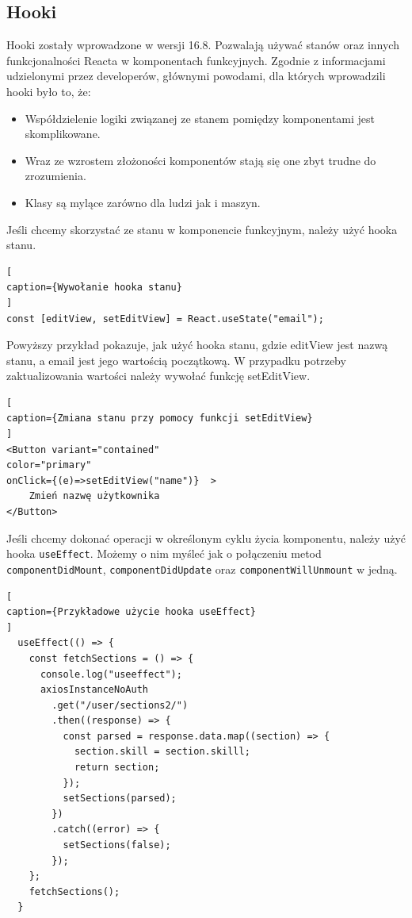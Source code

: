 \documentclass[oneside,polski,logo,indent]{amuthesis}
\begin{document}
\subsection{Hooki}
Hooki zostały wprowadzone w wersji 16.8. Pozwalają używać stanów oraz innych funkcjonalności Reacta w komponentach funkcyjnych.
\newline
Zgodnie z informacjami udzielonymi przez developerów, głównymi powodami, dla których wprowadzili hooki było to, że:
\begin{itemize}
\item Współdzielenie logiki związanej ze stanem pomiędzy komponentami jest skomplikowane.
\item Wraz ze wzrostem złożoności komponentów stają się one zbyt trudne do zrozumienia.
\item Klasy są mylące zarówno dla ludzi jak i maszyn.
\end{itemize}
Jeśli chcemy skorzystać ze stanu w komponencie funkcyjnym, należy użyć hooka stanu.
\begin{lstlisting}[
caption={Wywołanie hooka stanu}
]
const [editView, setEditView] = React.useState("email");
\end{lstlisting}
Powyższy przykład pokazuje, jak użyć hooka stanu, gdzie editView jest nazwą stanu, a email jest jego wartością początkową. W przypadku potrzeby zaktualizowania wartości należy 
wywołać funkcję setEditView.
\begin{lstlisting}[
caption={Zmiana stanu przy pomocy funkcji setEditView}
]
<Button variant="contained" 
color="primary" 
onClick={(e)=>setEditView("name")}  >
	Zmień nazwę użytkownika
</Button>
\end{lstlisting}
Jeśli chcemy dokonać operacji w określonym cyklu życia komponentu, należy użyć hooka \texttt{useEffect}. Możemy o nim myśleć jak o połączeniu metod \texttt{componentDidMount}, \texttt{componentDidUpdate} oraz \texttt{componentWillUnmount} w jedną.
\begin{lstlisting}[
caption={Przykładowe użycie hooka useEffect}
]
  useEffect(() => {
    const fetchSections = () => {
      console.log("useeffect");
      axiosInstanceNoAuth
        .get("/user/sections2/")
        .then((response) => {
          const parsed = response.data.map((section) => {
            section.skill = section.skilll;
            return section;
          });
          setSections(parsed);
        })
        .catch((error) => {
          setSections(false);
        });
    };
    fetchSections();
  }
\end{lstlisting}
\end{document}
